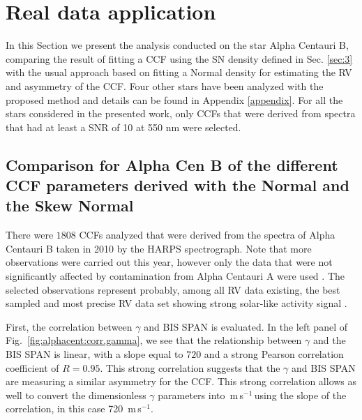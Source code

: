 \documentclass{aa}
\def\ms{\hbox{\,m\,s$^{-1}$}}         %
\newcommand{\xavier}[1]{{\color{blue}[[\textbf{Xavier: }#1]]}}
\begin{document}
\section{Real data application} \label{sec:4}

In this Section we present the analysis conducted on the star Alpha Centauri B, comparing the result of fitting a CCF using the SN density defined in Sec. \ref{sec:3} with the usual approach based on fitting a Normal density for estimating the RV and asymmetry of the CCF. 
Four other stars have been analyzed with the proposed method and details can be found in Appendix \ref{appendix}. 
For all the stars considered in the presented work, only CCFs that were derived from spectra that had at least a SNR of 10 at 550 nm were selected. 


\subsection{Comparison for Alpha Cen B of the different CCF parameters derived with the Normal and the Skew Normal} \label{sec:alphacentb}

There were $1808$ CCFs analyzed that were derived from the spectra of Alpha Centauri B taken in 2010 by the HARPS spectrograph. Note that more observations were carried out this year, however only the data that were not significantly affected by contamination from Alpha Centauri A were used \citep[see][]{Dumusque-2012}. 
The selected observations represent probably, among all RV data existing, the best sampled and most precise RV data set showing strong solar-like activity signal \citep{Thompson-2017, Dumusque-2012}.

First, the correlation between $\gamma$ and BIS SPAN is evaluated.
In the left panel of Fig.~\ref{fig:alphacent:corr.gamma}, we see that the relationship between $\gamma$ and the BIS SPAN is linear, with a slope equal to $720$ and a strong Pearson correlation coefficient of $R=0.95$. This strong correlation suggests that the $\gamma$ and BIS SPAN are measuring a similar asymmetry for the CCF. This strong correlation allows as well to convert the dimensionless $\gamma$ parameters into \ms\,using the slope of the correlation, in this case 720 \ms.
\end{document}
